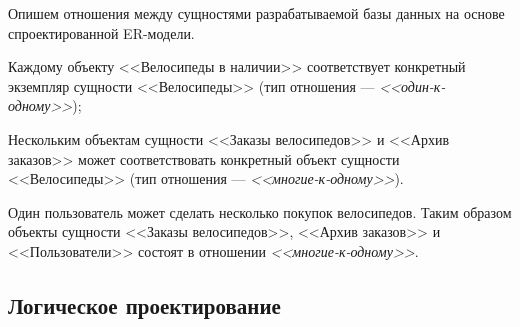 Опишем отношения между сущностями разрабатываемой базы данных на основе спроектированной ER-модели.

Каждому объекту <<Велосипеды в наличии>> соответствует конкретный экземпляр
сущности <<Велосипеды>> (тип отношения --- \textit{<<один-к-одному>>});


Нескольким объектам сущности <<Заказы велосипедов>> и <<Архив заказов>> может
соответствовать конкретный объект сущности <<Велосипеды>> (тип отношения ---
\textit{<<многие-к-одному>>}).

Один пользователь может сделать несколько покупок велосипедов. Таким образом
объекты сущности <<Заказы велосипедов>>, <<Архив заказов>> и <<Пользователи>>
состоят в отношении \textit{<<многие-к-одному>>}.


\pagebreak

\subsection{Логическое проектирование}
\label{sub:db_structure_logical_design}

